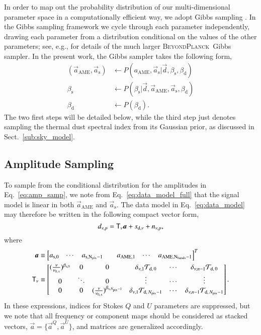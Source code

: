 \documentclass[twocolumn]{aa}
\renewcommand{\d}[0]{\vec{d}}
\renewcommand{\a}[0]{\vec{a}}
\newcommand{\BP}{\textsc{BeyondPlanck}}
\begin{document}
In order to map out the probability distribution of our
multi-dimensional parameter space in a computationally efficient way,
we adopt Gibbs sampling \citep[e.g.,][]{Gelman03}. In the Gibbs
sampling framework we cycle through each parameter independently,
drawing each parameter from a distribution conditional on the values
of the other parameters; see, e.g., \citet{bp01} for details of the
much larger \BP\ Gibbs sampler. In the present work, the Gibbs sampler
takes the following form,
\begin{align}
(\a_{\mathrm{AME}},\a_{\mathrm{s}}) &\leftarrow P(a_{\mathrm{AME}}, \a_{\mathrm{s}}|
  \d, \beta_{\mathrm{s}}, \beta_{\mathrm{d}})\label{eq:amp_samp}\\
\beta_{\mathrm{s}}  &\leftarrow P(\beta_{\mathrm{s}}|
\d, \a_{\mathrm{AME}}, \a_{\mathrm{s}}, \beta_{\mathrm{d}}) \label{eq:beta_samp}\\
\beta_{\mathrm{d}}  &\leftarrow P(\beta_{\mathrm{d}}).
\label{eq:gibbs}
\end{align}
The two first steps will be detailed below, while the third step just
denotes sampling the thermal dust spectral index from its Gaussian
prior, as discussed in Sect.~\ref{sub:sky_model}.

\subsection{Amplitude Sampling}\label{sub:joint}

To sample from the conditional distribution for the amplitudes in
Eq.~\eqref{eq:amp_samp}, we note from Eq.~\eqref{eq:data_model_full}
that the signal model is linear in both $\a_{\mathrm{AME}}$ and
$\a_{\mathrm{s}}$. The data model in Eq.~\eqref{eq:data_model} may
therefore be written in the following compact vector form,
\begin{equation}
{d}_{\nu, p} = \mathsf{T}_{\nu}\boldsymbol{a} + s_{\mathrm{d},\nu} + {n}_{\nu,p},
\end{equation}
where
{\tiny
\begin{align}
\boldsymbol{a} &\equiv\begin{bmatrix}
a_{\rm s, 0} & \cdots & a_{\rm s, N_{\rm pix}-1} & & a_{\rm AME, 1} & \cdots & a_{\rm AME, N_{\rm bands} - 1} 
\end{bmatrix}^T\nonumber\\
\mathsf{T}_{\nu} &\equiv\begin{bmatrix}
(\frac{\nu}{\nu_{0,\,{\rm s}}})^{\beta_{{\rm s},0}} & 0 & 0 & \delta_{\nu,1}\mathcal{T}_{\mathrm{d},\,0}&\cdots& \delta_{\nu,n-1}\mathcal{T}_{\mathrm{d},\,0}\\
 0 & \ddots & 0 & \vdots & \cdots & \vdots\\
 0 & 0 & (\frac{\nu}{\nu_{0,\,{\rm s}}})^{\beta_{{\rm s},N_{\rm pix}-1}} & \delta_{\nu,1}\mathcal{T}_{\mathrm{d},\,N_{\rm pix}-1}&\cdots& \delta_{\nu,n-1}\mathcal{T}_{\mathrm{d},\,N_{\rm pix}-1}
\end{bmatrix}.\nonumber
\end{align}}
In these expressions, indices for Stokes $Q$ and $U$ parameters are
suppressed, but we note that all frequency or component maps should be
considered as stacked vectors, $\a = \{\a^Q,\a^U\}$, and matrices are
generalized accordingly.
\end{document}
